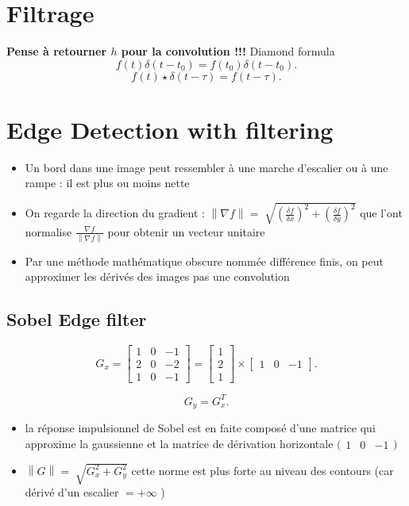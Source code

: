 \documentclass{article}
\theoremstyle{plain}%
\theoremstyle{definition}
\theoremstyle{remark}
\begin{document}
\section{Filtrage}
\textbf{Pense à retourner $ h $ pour la convolution !!!}
Diamond formula 
\[
    f(t)\delta (t-t_0) = f(t_0)\delta (t - t_0)
.\]
\[
    f(t) \star \delta (t - \tau) = f(t - \tau)
.\]


\section{Edge Detection with filtering}
\begin{itemize}
    \item Un bord dans une image peut ressembler à une marche d'escalier ou à une rampe : il est plus ou moins nette
    \item On regarde la direction du gradient : $ \left\| \nabla f \right\| = \sqrt[]{(\frac{\delta f}{\delta x})^2 + (\frac{\delta f}{\delta y})^2} $ que l'ont normalise $ \frac{\nabla f}{\left\| \nabla f \right\| } $ pour obtenir un vecteur unitaire
    \item Par une méthode mathématique obscure nommée différence finis, on peut approximer les dérivés des images pas une convolution 
\end{itemize}
\subsection{Sobel Edge filter}
\[
    G_x = \begin{bmatrix}
        1 & 0 & -1 \\
        2 & 0 & -2 \\
        1 & 0 & -1 
    \end{bmatrix} = \begin{bmatrix}
        1 \\
        2 \\
        1
    \end{bmatrix} \times \begin{bmatrix}
        1 & 0 & -1
    \end{bmatrix}
.\]

\[
    G_y = G_x^T
.\]


\begin{itemize}
    \item la réponse impulsionnel de Sobel est en faite composé d'une matrice qui approxime la gaussienne et la matrice de dérivation horizontale $ \big(\begin{smallmatrix}
        1 & 0 & -1
    \end{smallmatrix}\big) $ 
    \item $ \left\| G \right\| = \sqrt[]{G_x^2 + G_y^2} $ cette norme est plus forte au niveau des contours (car dérivé d'un escalier $ = + \infty  $ )
\end{itemize}
\end{document}
